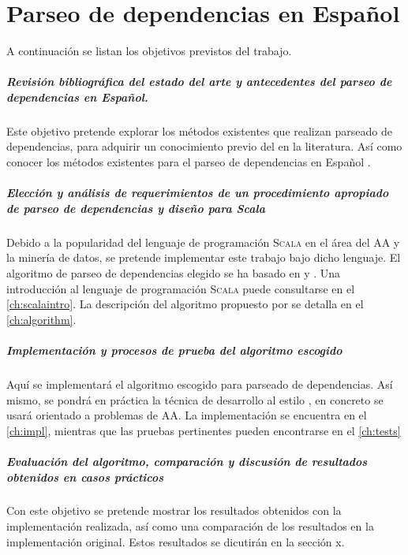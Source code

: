 \chapter{Parseo de dependencias en Español}\label{ch:depparsing}

A continuación se listan los objetivos previstos del trabajo.

\paragraph{Revisión bibliográfica del estado del arte y antecedentes del parseo
  de dependencias en Español.} Este objetivo pretende explorar los métodos
existentes que realizan parseado de dependencias, para adquirir un conocimiento
previo del  en la literatura. Así como conocer los
métodos existentes para el parseo de dependencias en Español
\cite{ballesteros2016}.

\paragraph{Elección y análisis de requerimientos de un procedimiento apropiado de
  parseo de dependencias y diseño para Scala}
Debido a la popularidad del lenguaje de programación \textsc{Scala} en el área
del \ac{AA} y la minería de datos, se pretende implementar este trabajo bajo
dicho lenguaje. El algoritmo de parseo de dependencias elegido se ha basado en
\citeauthor{yamada2003} \cite{yamada2003} y \citeauthor{rohit2016}
\cite{rohit2016}. Una introducción al lenguaje de programación \textsc{Scala}
puede consultarse en el \autoref{ch:scalaintro}. La descripción del algoritmo
propuesto por \citeauthor{yamada2003} se detalla en el \autoref{ch:algorithm}.

\paragraph{Implementación y procesos de prueba del algoritmo escogido}
Aquí se implementará el algoritmo escogido para parseado de dependencias. Así
mismo, se pondrá en práctica la técnica de desarrollo al estilo
, en concreto se usará  orientado a
problemas de \ac{AA}. La implementación se encuentra en el \autoref{ch:impl},
mientras que las pruebas pertinentes pueden encontrarse en el \autoref{ch:tests}

\paragraph{Evaluación del algoritmo, comparación y discusión de resultados
  obtenidos en casos prácticos}
Con este objetivo se pretende mostrar los resultados obtenidos con la
implementación realizada, así como una comparación de los resultados en la
implementación original. Estos resultados se dicutirán en la sección x.

